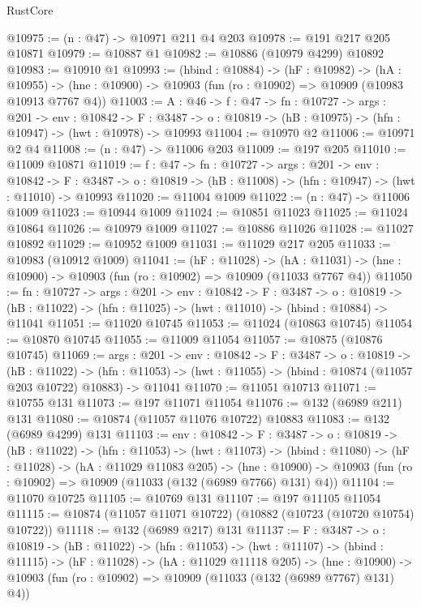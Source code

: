 \begin{lexlean}{RustCore}
\begin{coremodule}
@10975 := (n : @47) -> @10971 @211 @4 @203
@10978 := @191 @217 @205 @10871
@10979 := @10887 @1
@10982 := @10886 (@10979 @4299) @10892
@10983 := @10910 @1
@10993 := (hbind : @10884) ->
  (hF : @10982) ->
  (hA : @10955) -> (hne : @10900) -> @10903 (fun (ro : @10902) => @10909 (@10983 @10913 @7767 @4))
@11003 := {A : @46} ->
  {f : @47} ->
  {fn : @10727} ->
  {args : @201} ->
  {env : @10842} ->
  {F : @3487} -> {o : @10819} -> (hB : @10975) -> (hfn : @10947) -> (hwt : @10978) -> @10993
@11004 := @10970 @2
@11006 := @10971 @2 @4
@11008 := (n : @47) -> @11006 @203
@11009 := @197 @205
@11010 := @11009 @10871
@11019 := {f : @47} ->
  {fn : @10727} ->
  {args : @201} ->
  {env : @10842} ->
  {F : @3487} -> {o : @10819} -> (hB : @11008) -> (hfn : @10947) -> (hwt : @11010) -> @10993
@11020 := @11004 @1009
@11022 := (n : @47) -> @11006 @1009
@11023 := @10944 @1009
@11024 := @10851 @11023
@11025 := @11024 @10864
@11026 := @10979 @1009
@11027 := @10886 @11026
@11028 := @11027 @10892
@11029 := @10952 @1009
@11031 := @11029 @217 @205
@11033 := @10983 (@10912 @1009)
@11041 := (hF : @11028) ->
  (hA : @11031) -> (hne : @10900) -> @10903 (fun (ro : @10902) => @10909 (@11033 @7767 @4))
@11050 := {fn : @10727} ->
  {args : @201} ->
  {env : @10842} ->
  {F : @3487} ->
  {o : @10819} -> (hB : @11022) -> (hfn : @11025) -> (hwt : @11010) -> (hbind : @10884) -> @11041
@11051 := @11020 @10745
@11053 := @11024 (@10863 @10745)
@11054 := @10870 @10745
@11055 := @11009 @11054
@11057 := @10875 (@10876 @10745)
@11069 := {args : @201} ->
  {env : @10842} ->
  {F : @3487} ->
  {o : @10819} ->
  (hB : @11022) ->
  (hfn : @11053) -> (hwt : @11055) -> (hbind : @10874 (@11057 @203 @10722) @10883) -> @11041
@11070 := @11051 @10713
@11071 := @10755 @131
@11073 := @197 @11071 @11054
@11076 := @132 (@6989 @211) @131
@11080 := @10874 (@11057 @11076 @10722) @10883
@11083 := @132 (@6989 @4299) @131
@11103 := {env : @10842} ->
  {F : @3487} ->
  {o : @10819} ->
  (hB : @11022) ->
  (hfn : @11053) ->
  (hwt : @11073) ->
  (hbind : @11080) ->
  (hF : @11028) ->
  (hA : @11029 @11083 @205) ->
  (hne : @10900) -> @10903 (fun (ro : @10902) => @10909 (@11033 (@132 (@6989 @7766) @131) @4))
@11104 := @11070 @10725
@11105 := @10769 @131
@11107 := @197 @11105 @11054
@11115 := @10874 (@11057 @11071 @10722) (@10882 (@10723 (@10720 @10754) @10722))
@11118 := @132 (@6989 @217) @131
@11137 := {F : @3487} ->
  {o : @10819} ->
  (hB : @11022) ->
  (hfn : @11053) ->
  (hwt : @11107) ->
  (hbind : @11115) ->
  (hF : @11028) ->
  (hA : @11029 @11118 @205) ->
  (hne : @10900) -> @10903 (fun (ro : @10902) => @10909 (@11033 (@132 (@6989 @7767) @131) @4))

\end{coremodule}
\end{lexlean}
